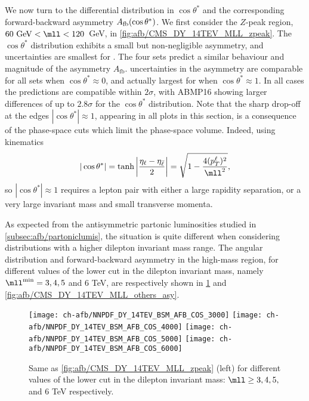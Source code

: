 We now turn to the differential distribution in
  $\cos\theta^*$ 
  and the corresponding forward-backward asymmetry $A_{\rm
    fb}(\cos\theta^*)$.
We first consider the $Z$-peak region, $60~{\text{GeV}} < \mll <
120$~GeV, in \cref{fig:afb/CMS_DY_14TEV_MLL_zpeak}.
%
The $\cos\theta^*$ 
distribution exhibits a small but non-negligible asymmetry,
and uncertainties are  smallest for .
%
The four \pdf sets predict a similar behaviour and magnitude
of the asymmetry $A_\mathrm{fb}$.
%
\pdf uncertainties in the asymmetry
are  comparable for  all \pdf sets when $\cos\theta^* \approx0$,
and actually  largest for  when $\cos\theta^* \approx 1$.
In all cases the predictions are compatible within $2 \sigma$,
with ABMP16 showing larger differences of up to $2.8 \sigma$ for the $\cos\theta^*$
distribution.
%
Note that the
sharp drop-off at the edges $|\cos\theta^*| \approx  1$, appearing in
all plots in this section, is a consequence of the phase-space cuts which
limit the phase-space volume.
%
Indeed, using  \lo kinematics
\begin{equation}
| \cos\theta^* | = \tanh \left| \frac{\eta_\ell - \eta_{\bar{\ell}}}{2} \right| = \sqrt{1 - \frac{4 (p_T^\ell)^2}{\mll^2}} \text{,}
\end{equation}
so $| \cos\theta^* | \approx 1$ requires a lepton pair with either
a large rapidity separation, or a very large invariant mass and small
transverse momenta. 

As expected from the antisymmetric partonic luminosities studied in
\cref{subsec:afb/partoniclumis}, the situation is quite different when
considering distributions with a higher dilepton invariant mass range.
%
The angular distribution and forward-backward asymmetry
in the high-mass region, for different values of the  lower cut in the dilepton
 invariant mass, namely $\mll^{\text{min}}=3, 4,5$ and 6 TeV, are
 respectively
 shown in
\cref{fig:afb/CMS_DY_14TEV_MLL_others} and \cref{fig:afb/CMS_DY_14TEV_MLL_others_asy}.

\begin{figure}[t!]
 \centering
 \texttt{[image: ch-afb/NNPDF\_DY\_14TEV\_BSM\_AFB\_COS\_3000]}
 \texttt{[image: ch-afb/NNPDF\_DY\_14TEV\_BSM\_AFB\_COS\_4000]}
 \texttt{[image: ch-afb/NNPDF\_DY\_14TEV\_BSM\_AFB\_COS\_5000]}
 \texttt{[image: ch-afb/NNPDF\_DY\_14TEV\_BSM\_AFB\_COS\_6000]}
 \caption{Same as \cref{fig:afb/CMS_DY_14TEV_MLL_zpeak} (left)
   for different values of the  lower cut in the dilepton
   invariant mass: $\mll \ge 3, 4,5,$ and 6 TeV respectively.
  }    
 \label{fig:afb/CMS_DY_14TEV_MLL_others}
\end{figure}

